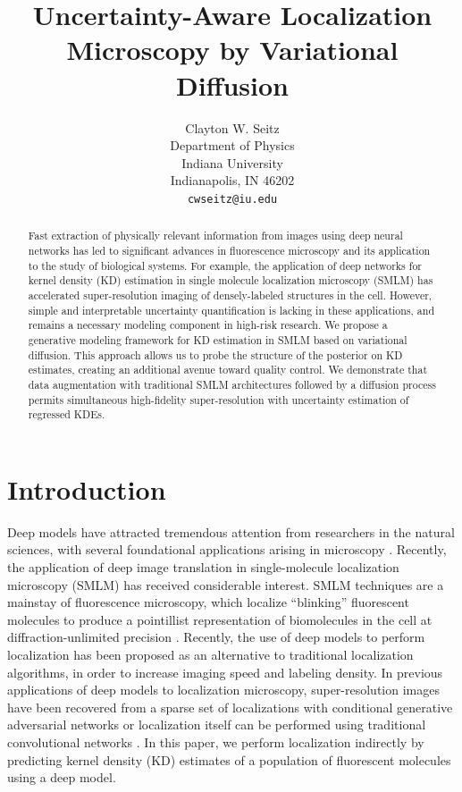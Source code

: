 \documentclass{article}
\title{Uncertainty-Aware Localization Microscopy by Variational Diffusion}
\author{%
  Clayton W. Seitz\\
  Department of Physics\\
  Indiana University\\
  Indianapolis, IN 46202 \\
  \texttt{cwseitz@iu.edu} \\
}
\begin{document}
\maketitle


\begin{abstract}

Fast extraction of physically relevant information from images using deep neural networks has led to significant advances in fluorescence microscopy and its application to the study of biological systems. For example, the application of deep networks for kernel density (KD) estimation in single molecule localization microscopy (SMLM) has accelerated super-resolution imaging of densely-labeled structures in the cell. However, simple and interpretable uncertainty quantification is lacking in these applications, and remains a necessary modeling component in high-risk research. We propose a generative modeling framework for KD estimation in SMLM based on variational diffusion. This approach allows us to probe the structure of the posterior on KD estimates, creating an additional avenue toward quality control. We demonstrate that data augmentation with traditional SMLM architectures followed by a diffusion process permits simultaneous high-fidelity super-resolution with uncertainty estimation of regressed KDEs. 
\end{abstract}

\section{Introduction}

Deep models have attracted tremendous attention from researchers in the natural sciences, with several foundational applications arising in microscopy \citep{Weigert2018,Falk2019}. Recently, the application of deep image translation in single-molecule localization microscopy (SMLM) has received considerable interest. SMLM techniques are a mainstay of fluorescence microscopy, which localize ``blinking'' fluorescent molecules to produce a pointillist representation of biomolecules in the cell at diffraction-unlimited precision \citep{Rust2006,Betzig2006}. Recently, the use of deep models to perform localization has been proposed as an alternative to traditional localization algorithms, in order to increase imaging speed and labeling density. In previous applications of deep models to localization microscopy, super-resolution images have been recovered from a sparse set of localizations with conditional generative adversarial networks \citep{Ouyang2018} or localization itself can be performed using traditional convolutional networks \citep{Nehme2020,Speiser2021}. In this paper, we perform localization indirectly by predicting kernel density (KD) estimates of a population of fluorescent molecules using a deep model. 
\end{document}
